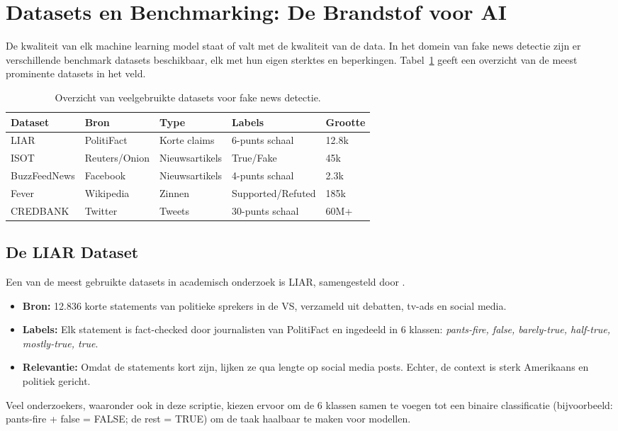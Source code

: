 \section{Datasets en Benchmarking: De Brandstof voor AI}
\label{sec:datasets}

De kwaliteit van elk machine learning model staat of valt met de kwaliteit van de data. In het domein van fake news detectie zijn er verschillende benchmark datasets beschikbaar, elk met hun eigen sterktes en beperkingen. Tabel~\ref{tab:datasets} geeft een overzicht van de meest prominente datasets in het veld.

\begin{table}[ht]
    \centering
    \caption{Overzicht van veelgebruikte datasets voor fake news detectie.}
    \label{tab:datasets}
    \begin{tabular}{@{}lllll@{}}
    \toprule
    \textbf{Dataset} & \textbf{Bron} & \textbf{Type} & \textbf{Labels} & \textbf{Grootte} \\ \midrule
    LIAR \autocite{Wang2017} & PolitiFact & Korte claims & 6-punts schaal & 12.8k \\
    ISOT & Reuters/Onion & Nieuwsartikels & True/Fake & 45k \\
    BuzzFeedNews & Facebook & Nieuwsartikels & 4-punts schaal & 2.3k \\
    Fever & Wikipedia & Zinnen & Supported/Refuted & 185k \\
    CREDBANK & Twitter & Tweets & 30-punts schaal & 60M+ \\ \bottomrule
    \end{tabular}
\end{table}

\subsection{De LIAR Dataset}
Een van de meest gebruikte datasets in academisch onderzoek is LIAR, samengesteld door \textcite{Wang2017}.
\begin{itemize}
    \item \textbf{Bron:} 12.836 korte statements van politieke sprekers in de VS, verzameld uit debatten, tv-ads en social media.
    \item \textbf{Labels:} Elk statement is fact-checked door journalisten van PolitiFact en ingedeeld in 6 klassen: \textit{pants-fire, false, barely-true, half-true, mostly-true, true}.
    \item \textbf{Relevantie:} Omdat de statements kort zijn, lijken ze qua lengte op social media posts. Echter, de context is sterk Amerikaans en politiek gericht.
\end{itemize}
Veel onderzoekers, waaronder ook in deze scriptie, kiezen ervoor om de 6 klassen samen te voegen tot een binaire classificatie (bijvoorbeeld: pants-fire + false = FALSE; de rest = TRUE) om de taak haalbaar te maken voor modellen.

